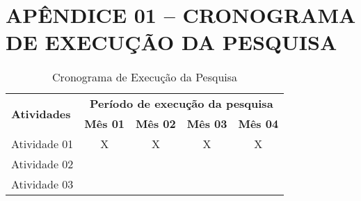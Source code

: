 \section{APÊNDICE 01 – CRONOGRAMA DE EXECUÇÃO DA PESQUISA}
\label{apendice-1}


\begin{table}[H]
    \centering
    \begin{tabular}{|l|c|c|c|c|}
        \hline
        \multirow{2}{7.5cm}{\textbf{Atividades}} & \multicolumn{4}{c|}{\textbf{Período de execução da pesquisa}} \\ \cline{2-5}
        & \textbf{Mês 01} & \textbf{Mês 02} & \textbf{Mês 03} & \textbf{Mês 04} \\ \hline
        Atividade 01 & X & X & X & X \\ \hline
        Atividade 02 &   &   &   &   \\ \hline
        Atividade 03 &   &   &   &   \\ \hline
    \end{tabular}
\caption{Cronograma de Execução da Pesquisa}
\end{table}
    